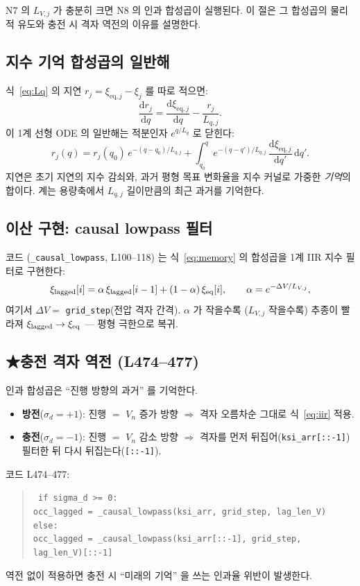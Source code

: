 \documentclass[11pt,a4paper]{article}
\newcommand{\dd}{\mathrm{d}}
\newcommand{\eq}{\mathrm{eq}}
\begin{document}
N7 의 $L_{V,j}$ 가 충분히 크면 N8 의 인과 합성곱이 실행된다. 이 절은
그 합성곱의 물리적 유도와 충전 시 격자 역전의 이유를 설명한다.

\subsection{지수 기억 합성곱의 일반해}

식~\eqref{eq:Lq} 의 지연 $r_j=\xi_{\eq,j}-\xi_j$ 를 따로 적으면:
\begin{equation}
\frac{\dd r_j}{\dd q} = \frac{\dd\xi_{\eq,j}}{\dd q} - \frac{r_j}{L_{q,j}}.
\label{eq:dr}
\end{equation}
이 1계 선형 ODE 의 일반해는 적분인자 $e^{q/L_q}$ 로 닫힌다:
\begin{equation}
r_j(q) = r_j(q_0)\,e^{-(q-q_0)/L_{q,j}}
+ \int_{q_0}^{q} e^{-(q-q')/L_{q,j}}\,\frac{\dd\xi_{\eq,j}}{\dd q'}\,\dd q'.
\label{eq:memory}
\end{equation}
지연은 초기 지연의 지수 감쇠와, 과거 평형 목표 변화율을 지수 커널로 가중한
\emph{기억}의 합이다. 계는 용량축에서 $L_{q,j}$ 길이만큼의 최근 과거를 기억한다.

\subsection{이산 구현: causal lowpass 필터}

코드 (\texttt{\_causal\_lowpass}, L100--118) 는 식~\eqref{eq:memory} 의 합성곱을
1계 IIR 지수 필터로 구현한다:
\begin{equation}
\xi_{\rm lagged}[i] = \alpha\,\xi_{\rm lagged}[i-1] + (1-\alpha)\,\xi_{\eq}[i],
\qquad \alpha = e^{-\Delta V/L_{V,j}},
\label{eq:iir}
\end{equation}
여기서 $\Delta V = $ \texttt{grid\_step}(전압 격자 간격). $\alpha$ 가 작을수록
($L_{V,j}$ 작을수록) 추종이 빨라져 $\xi_{\rm lagged}\to\xi_{\eq}$ — 평형 극한으로 복귀.

\subsection{★충전 격자 역전 (L474--477)}

인과 합성곱은 ``진행 방향의 과거'' 를 기억한다.
\begin{itemize}
\item \textbf{방전}($\sigma_d=+1$): 진행 $=$ $V_n$ 증가 방향 $\Rightarrow$ 격자 오름차순 그대로
  식~\eqref{eq:iir} 적용.
\item \textbf{충전}($\sigma_d=-1$): 진행 $=$ $V_n$ 감소 방향 $\Rightarrow$ 격자를 먼저
  뒤집어(\texttt{ksi\_arr[::-1]}) 필터한 뒤 다시 뒤집는다(\texttt{[::-1]}).
\end{itemize}
코드 L474--477:
\begin{quote}\small\texttt{%
if sigma\_d >= 0:\\
\quad occ\_lagged = \_causal\_lowpass(ksi\_arr, grid\_step, lag\_len\_V)\\
else:\\
\quad occ\_lagged = \_causal\_lowpass(ksi\_arr[::-1], grid\_step, lag\_len\_V)[::-1]
}\end{quote}
역전 없이 적용하면 충전 시 ``미래의 기억'' 을 쓰는 인과율 위반이 발생한다.
\end{document}

